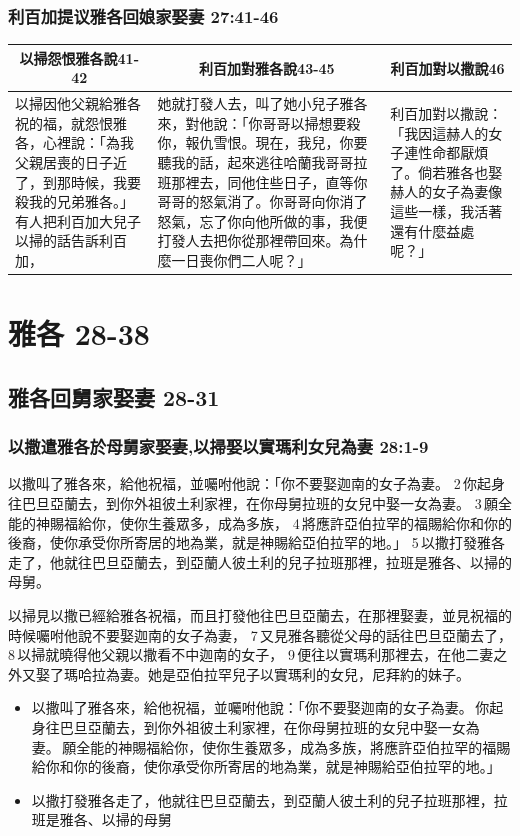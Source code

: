 \subsubsection{利百加提议雅各回娘家娶妻 27:41-46}
\begin{table}[H]
\centering
\begin{tabular}{p{4.5cm}|p{8.50cm}|p{3.50cm}}\hline\hline
\multicolumn{1}{c|}{以掃怨恨雅各說41-42}&\multicolumn{1}{c|}{利百加對雅各說43-45}&\multicolumn{1}{c}{利百加對以撒說46}\\\hline
以掃因他父親給雅各祝的福，就怨恨雅各，心裡說：「為我父親居喪的日子近了，到那時候，我要殺我的兄弟雅各。」有人把利百加大兒子以掃的話告訴利百加，
&她就打發人去，叫了她小兒子雅各來，對他說：「你哥哥以掃想要殺你，報仇雪恨。現在，我兒，你要聽我的話，起來逃往哈蘭我哥哥拉班那裡去，同他住些日子，直等你哥哥的怒氣消了。你哥哥向你消了怒氣，忘了你向他所做的事，我便打發人去把你從那裡帶回來。為什麼一日喪你們二人呢？」
&利百加對以撒說：「我因這赫人的女子連性命都厭煩了。倘若雅各也娶赫人的女子為妻像這些一樣，我活著還有什麼益處呢？」\\\hline
\end{tabular}
\end{table}

\section{雅各 28-38}
\subsection{雅各回舅家娶妻 28-31}
\subsubsection{以撒遣雅各於母舅家娶妻,以掃娶以實瑪利女兒為妻 28:1-9}
\label{sec:YaGeHuiMuJiuJia}
以撒叫了雅各來，給他祝福，並囑咐他說：「你不要娶迦南的女子為妻。 2 你起身往巴旦亞蘭去，到你外祖彼土利家裡，在你母舅拉班的女兒中娶一女為妻。 3 願全能的神賜福給你，使你生養眾多，成為多族， 4 將應許亞伯拉罕的福賜給你和你的後裔，使你承受你所寄居的地為業，就是神賜給亞伯拉罕的地。」 5 以撒打發雅各走了，他就往巴旦亞蘭去，到亞蘭人彼土利的兒子拉班那裡，拉班是雅各、以掃的母舅。

以掃見以撒已經給雅各祝福，而且打發他往巴旦亞蘭去，在那裡娶妻，並見祝福的時候囑咐他說不要娶迦南的女子為妻， 7 又見雅各聽從父母的話往巴旦亞蘭去了， 8 以掃就曉得他父親以撒看不中迦南的女子， 9 便往以實瑪利那裡去，在他二妻之外又娶了瑪哈拉為妻。她是亞伯拉罕兒子以實瑪利的女兒，尼拜約的妹子。
\iffalse
\begin{itemize} 
\itemsep-.35em 
\item 以撒叫了雅各來，給他祝福，並囑咐他說：「你不要娶迦南的女子為妻。 你起身往巴旦亞蘭去，到你外祖彼土利家裡，在你母舅拉班的女兒中娶一女為妻。 願全能的神賜福給你，使你生養眾多，成為多族，將應許亞伯拉罕的福賜給你和你的後裔，使你承受你所寄居的地為業，就是神賜給亞伯拉罕的地。」
\item 以撒打發雅各走了，他就往巴旦亞蘭去，到亞蘭人彼土利的兒子拉班那裡，拉班是雅各、以掃的母舅
\end{itemize} 

